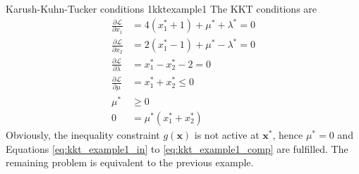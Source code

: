 \begin{example}{Karush-Kuhn-Tucker conditions 1}{kktexample1}
    The KKT conditions are 
    \begin{align}
        \frac{\partial \mathcal{\mathcal{L}}}{\partial x_1} &= 4 (x_1^* + 1) + \mu^* + \lambda^*  = 0\\
        \frac{\partial \mathcal{\mathcal{L}}}{\partial x_2} &= 2 (x_1^* - 1) + \mu^* - \lambda^*  = 0\\
        \frac{\partial \mathcal{\mathcal{L}}}{\partial \lambda} &= x_1^* - x_2^* - 2 = 0 \\
        \label{eq:kkt_example1_in}
        \frac{\partial \mathcal{\mathcal{L}}}{\partial \mu} &= x_1^*+x_2^* \le 0 \\
        \mu^* &\ge 0 \\
        0 &= \mu^*(x_1^*+x_2^*)
        \label{eq:kkt_example1_comp}
    \end{align}
    Obviously, the inequality constraint $g(\mathbf{x})$ is not active at $\mathbf{x}^*$, hence $\mu^*=0$ and Equations \eqref{eq:kkt_example1_in} to \eqref{eq:kkt_example1_comp} are fulfilled. The remaining problem is equivalent to the previous example.
\end{example}

